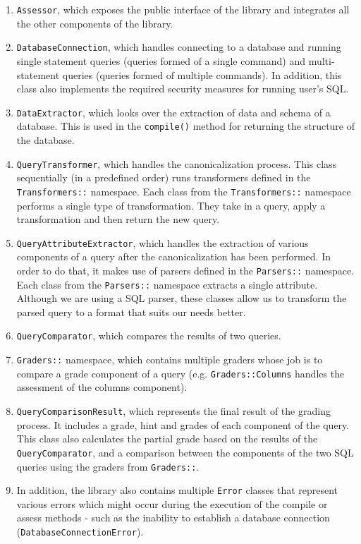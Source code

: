 \begin{enumerate}
    \item \texttt{Assessor}, which exposes the public interface of the library and integrates all the other components of the library.
    \item \texttt{DatabaseConnection}, which handles connecting to a database and running single statement queries (queries formed of a single command) and multi-statement queries (queries formed of multiple commands). In addition, this class also implements the required security measures for running user's SQL.
    \item \texttt{DataExtractor}, which looks over the extraction of data and schema of a database. This is used in the \texttt{compile()} method for returning the structure of the database.
    \item \texttt{QueryTransformer}, which handles the canonicalization process. This class sequentially (in a predefined order) runs transformers defined in the \texttt{Transformers::} namespace. Each class from the \texttt{Transformers::} namespace performs a single type of transformation. They take in a query, apply a transformation and then return the new query.
    \item \texttt{QueryAttributeExtractor}, which handles the extraction of various components of a query after the canonicalization has been performed. In order to do that, it makes use of parsers defined in the \texttt{Parsers::} namespace. Each class from the \texttt{Parsers::} namespace extracts a single attribute. Although we are using a SQL parser, these classes allow us to transform the parsed query to a format that suits our needs better.
    \item \texttt{QueryComparator}, which compares the results of two queries.
    \item \texttt{Graders::} namespace, which contains multiple graders whose job is to compare a grade component of a query (e.g. \texttt{Graders::Columns} handles the assessment of the columns component).
    \item \texttt{QueryComparisonResult}, which represents the final result of the grading process. It includes a grade, hint and grades of each component of the query. This class also calculates the partial grade based on the results of the \texttt{QueryComparator}, and a comparison between the components of the two SQL queries using the graders from \texttt{Graders::}.
    \item In addition, the library also contains multiple \texttt{Error} classes that represent various errors which might occur during the execution of the compile or assess methods - such as the inability to establish a database connection (\texttt{DatabaseConnectionError}).
\end{enumerate}

